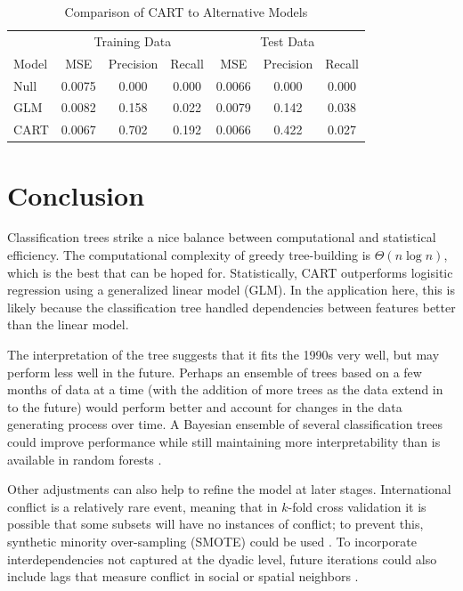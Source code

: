 \documentclass[12pt,letterpaper]{article}
\begin{document}
\begin{table}
	\caption{Comparison of CART to Alternative Models}
	\label{cart-perf}
  \begin{center}
  \begin{tabular}{l|ccc|ccc}
   \multicolumn{1}{c}{} & \multicolumn{3}{c}{Training Data} & \multicolumn{3}{c}{Test Data} \\
  Model & MSE & Precision & Recall & MSE & Precision & Recall \\
  \midrule
  Null & 0.0075 & 0.000 & 0.000 & 0.0066 & 0.000 & 0.000 \\
  GLM & 0.0082 & 0.158 & 0.022  & 0.0079 & 0.142 & 0.038 \\
  CART & 0.0067 & 0.702 & 0.192 & 0.0066 & 0.422 & 0.027 
  \end{tabular}
  \end{center}
\end{table}


\section{Conclusion}
\label{conclusion}

Classification trees strike a nice balance between computational and statistical efficiency. The computational complexity of greedy tree-building is $\Theta(n \log n)$, which is the best that can be hoped for. Statistically, CART outperforms logisitic regression using a generalized linear model (GLM). In the application here, this is likely because the classification tree handled dependencies between features better than the linear model. 

The interpretation of the tree suggests that it fits the 1990s very well, but may perform less well in the future. Perhaps an ensemble of trees based on a few months of data at a time (with the addition of more trees as the data extend in to the future) would perform better and account for changes in the data generating process over time. A Bayesian ensemble of several classification trees could improve performance while still maintaining more interpretability than is available in random forests \citep{arva2013improving,montgomery2012improving,Raftery:1995,raftery2005using}.

Other adjustments can also help to refine the model at later stages. International conflict is a relatively rare event, meaning that in $k$-fold cross validation it is possible that some subsets will have no instances of conflict; to prevent this, synthetic minority over-sampling (SMOTE) could be used \citep{chawla2002smote}. To incorporate interdependencies not captured at the dyadic level, future iterations could also include lags that measure conflict in social or spatial neighbors \citep{gleditsch2000war,gleditsch2001measuring,hoff2004modeling,ward1998democratizing,ward2007disputes,ward2011network}.
\end{document}
